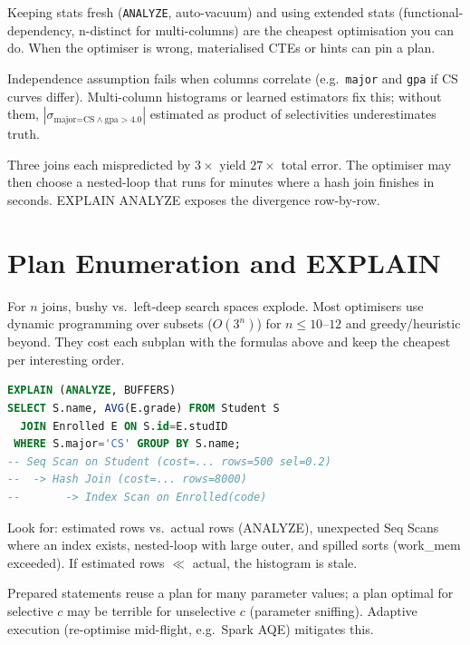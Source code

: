 Keeping stats fresh (\texttt{ANALYZE}, auto-vacuum) and using extended stats (functional-dependency, n-distinct for multi-columns) are the cheapest optimisation you can do. When the optimiser is wrong, materialised CTEs or hints can pin a plan.

\begin{remark}
Independence assumption fails when columns correlate (e.g.\ \texttt{major} and \texttt{gpa} if CS curves differ). Multi-column histograms or learned estimators fix this; without them, $| \sigma_{\text{major=CS} \land \text{gpa}>4.0}|$ estimated as product of selectivities underestimates truth.
\end{remark}

\begin{example}
Three joins each mispredicted by $3\times$ yield $27\times$ total error. The optimiser may then choose a nested-loop that runs for minutes where a hash join finishes in seconds. EXPLAIN ANALYZE exposes the divergence row-by-row.
\end{example}

\section{Plan Enumeration and EXPLAIN}
\label{sec:explain}

For $n$ joins, bushy vs.\ left-deep search spaces explode. Most optimisers use dynamic programming over subsets ($O(3^n)$) for $n\le10$--$12$ and greedy/heuristic beyond. They cost each subplan with the formulas above and keep the cheapest per interesting order.

\begin{lstlisting}[language=SQL, caption={Reading EXPLAIN}, label={lst:explain}]
EXPLAIN (ANALYZE, BUFFERS)
SELECT S.name, AVG(E.grade) FROM Student S
  JOIN Enrolled E ON S.id=E.studID
 WHERE S.major='CS' GROUP BY S.name;
-- Seq Scan on Student (cost=... rows=500 sel=0.2)
--  -> Hash Join (cost=... rows=8000)
--       -> Index Scan on Enrolled(code)
\end{lstlisting}

Look for: estimated rows vs.\ actual rows (ANALYZE), unexpected Seq Scans where an index exists, nested-loop with large outer, and spilled sorts (work\_mem exceeded). If estimated rows $\ll$ actual, the histogram is stale.

\begin{remark}
Prepared statements reuse a plan for many parameter values; a plan optimal for selective $c$ may be terrible for unselective $c$ (parameter sniffing). Adaptive execution (re-optimise mid-flight, e.g.\ Spark AQE) mitigates this.
\end{remark}

